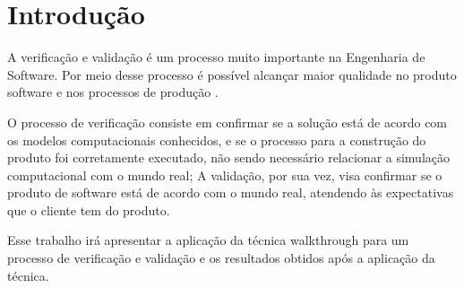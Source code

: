 \chapter[Introdução]{Introdução}

A verificação e validação é um processo muito importante na Engenharia de Software.
Por meio desse processo é possível alcançar maior qualidade no produto software
e nos processos de produção \cite{e05}.

O processo de verificação consiste em confirmar se a solução está de acordo com
os modelos computacionais conhecidos, e se o processo para a construção do produto
foi corretamente executado, não sendo necessário relacionar a simulação computacional
com o mundo real; A validação, por sua vez, visa confirmar se o produto de software
está de acordo com o mundo real, atendendo às expectativas que o cliente tem do
produto\cite{e06}.

Esse trabalho irá apresentar a aplicação da técnica walkthrough para um processo
de verificação e validação e os resultados obtidos após a aplicação da técnica.
